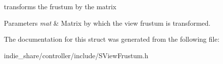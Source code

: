 transforms the frustum by the matrix 


\begin{DoxyParams}{Parameters}
{\em mat} & Matrix by which the view frustum is transformed. \\
\hline
\end{DoxyParams}


The documentation for this struct was generated from the following file\+:\begin{DoxyCompactItemize}
\item 
indie\+\_\+share/controller/include/S\+View\+Frustum.\+h\end{DoxyCompactItemize}

